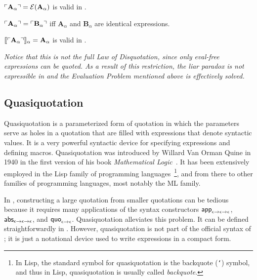 \documentclass[fleqn]{llncs}
\begin{document}
\begin{thm} \label{thm:sem-quotation}
$\ulcorner\textbf{A}_\alpha\urcorner = \mbox{$\cal E$}(\textbf{A}_\alpha)$ is valid in
  {\churchqe}.
\end{thm}

\begin{cor}$\ulcorner\textbf{A}_\alpha\urcorner = \ulcorner\textbf{B}_\alpha\urcorner$ iff $\textbf{A}_\alpha$ and $\textbf{B}_\alpha$ are identical expressions.
\end{cor}

\begin{thm} \label{thm:sem-disquotation}
$\llbracket\ulcorner\textbf{A}_\alpha\urcorner\rrbracket_\alpha = \textbf{A}_\alpha$
  is valid in {\churchqe}.
\end{thm}

\begin{rem}\em
Notice that this is not the full Law of Disquotation, since only
eval-free expressions can be quoted.  As a result of this restriction,
the liar paradox is not expressible in {\churchqe} and the Evaluation
Problem mentioned above is effectively solved.
\end{rem}

\subsection{Quasiquotation}

Quasiquotation is a parameterized form of quotation in which the
parameters serve as holes in a quotation that are filled with
expressions that denote syntactic values.  It is a very powerful
syntactic device for specifying expressions and defining macros.
Quasiquotation was introduced by Willard Van Orman Quine in 1940 in
the first version of his book \emph{Mathematical
  Logic}~\cite{Quine03}.  It has been extensively employed in the Lisp
family of programming languages~\cite{Bawden99}\footnote{In Lisp, the
  standard symbol for quasiquotation is the backquote ({\tt `})
  symbol, and thus in Lisp, quasiquotation is usually called
  \emph{backquote}.}, and from there to other families of
programming languages, most notably the ML family.

In {\churchqe}, constructing a large quotation from smaller quotations
can be tedious because it requires many applications of the syntax
constructors $\mbox{\sf app}_{\epsilon \rightarrow \epsilon \rightarrow
  \epsilon}$, $\mbox{\sf abs}_{\epsilon \rightarrow \epsilon \rightarrow
  \epsilon}$, and $\mbox{\sf quo}_{\epsilon \rightarrow \epsilon}$.
Quasiquotation alleviates this problem.
It can be defined straightforwardly in
{\churchqe}.  However, quasiquotation is not part of the official
syntax of {\churchqe}; it is just a notational device used to write
{\churchqe} expressions in a compact form.
\end{document}
